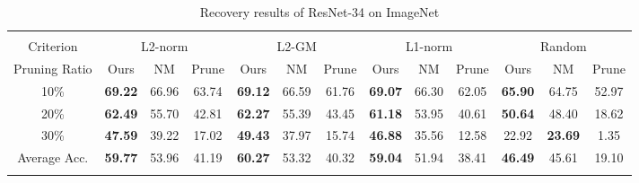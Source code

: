 \begin{table*}[t]
{\begin{tabular}{c||c|c|c||c|c|c||c|c|c||c|c|c}  \Xhline{2\arrayrulewidth}
\multicolumn{13}{c}{\textbf{ResNet34 - ImageNet (Acc. 73.27)}}
\\ \Xhline{2\arrayrulewidth} %
Criterion & \multicolumn{3}{c||}{L2-norm} & \multicolumn{3}{c||}{L2-GM} & \multicolumn{3}{c||}{L1-norm}& \multicolumn{3}{c}{Random}\\ \hline
Pruning Ratio& Ours& NM& Prune& Ours& NM& Prune& Ours& NM& Prune& Ours& NM& Prune\\ \Xhline{2\arrayrulewidth}
10\%& \textbf{69.22} & 66.96 & 63.74 & \textbf{69.12} & 66.59 & 61.76 & \textbf{69.07} & 66.30 & 62.05 & \textbf{65.90} & 64.75& 52.97 \\ \hline
20\%& \textbf{62.49} & 55.70 & 42.81 & \textbf{62.27} & 55.39 & 43.45 & \textbf{61.18} & 53.95 & 40.61 & \textbf{50.64} & 48.40& 18.62 \\ \hline
30\%& \textbf{47.59} & 39.22 & 17.02 & \textbf{49.43} & 37.97 & 15.74 & \textbf{46.88} & 35.56 & 12.58 & 22.92 & \textbf{23.69} & 1.35  \\ \Xhline{2\arrayrulewidth}
Average Acc. & \textbf{59.77} & 53.96 & 41.19 & \textbf{60.27} & 53.32 & 40.32 & \textbf{59.04} & 51.94 & 38.41 & \textbf{46.49} & 45.61& 19.10\\ \Xhline{2\arrayrulewidth}
\end{tabular}
}
\vspace{-1.5mm}
\caption{Recovery results of ResNet-34 on ImageNet}
\label{tab:ResNet34-ImageNet}
\vspace{1.5mm}

{\scriptsize

}
\end{table*}
